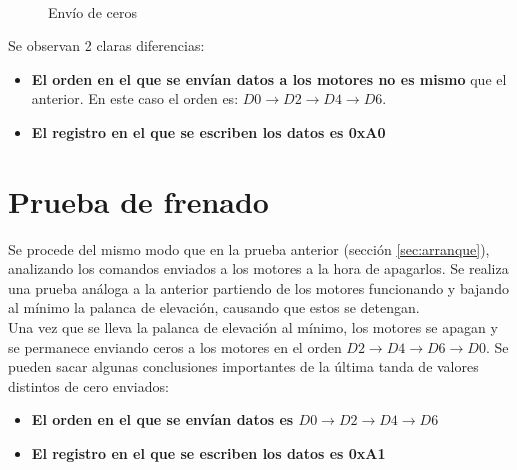 \documentclass[spanish,12pt,a4paper,titlepage]{report}
\begin{document}
\begin{figure} [h!]
\centering
   \\
  \caption{Envío de ceros}
  \label{fig:snif_arranque_cerca}
\end{figure}

Se observan 2 claras diferencias:
\begin{itemize}
\item \textbf{El orden en el que se envían datos a los motores no es mismo} que el anterior. En este caso el orden es: $D0\rightarrow D2\rightarrow D4\rightarrow D6$.
\item \textbf{El registro en el que se escriben los datos es 0xA0}
\end{itemize}


\section{Prueba de frenado}
Se procede del mismo modo que en la prueba anterior (sección \ref{sec:arranque}), analizando los comandos enviados a los motores a la hora de apagarlos. Se realiza una prueba análoga a la anterior partiendo de los motores funcionando y bajando al mínimo la palanca de elevación, causando que estos se detengan.\\

Una vez que se lleva la palanca de elevación al mínimo, los motores se apagan y se permanece enviando ceros a los motores en el orden $D2\rightarrow D4\rightarrow D6\rightarrow D0$. Se pueden sacar algunas conclusiones importantes de la última tanda de valores distintos de cero enviados:
\begin{itemize}
\item \textbf{El orden en el que se envían datos es $D0\rightarrow D2\rightarrow D4\rightarrow D6$}
\item \textbf{El registro en el que se escriben los datos es 0xA1}
\end{itemize}
\end{document}
